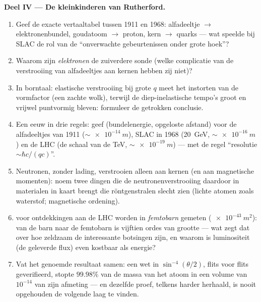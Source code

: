 \begin{problem}
\medskip\noindent\textbf{Deel IV --- De kleinkinderen van Rutherford.}
\begin{enumerate}[resume]
  \item Geef de exacte vertaaltabel tussen 1911 en 1968: alfadeeltje
        $\to$ elektronenbundel, goudatoom $\to$ proton, kern $\to$ quarks
        --- wat speelde bij SLAC de rol van de ``onverwachte
        gebeurtenissen onder grote hoek''?
  \item Waarom zijn \emph{elektronen} de zuiverdere sonde (welke
        complicatie van de verstrooiing van alfadeeltjes aan kernen
        hebben zij niet)?
  \item In borntaal: elastische verstrooiing bij grote $q$ meet het
        instorten van de vormfactor (een zachte wolk), terwijl de
        diep-inelastische tempo's groot en vrijwel puntvormig bleven:
        formuleer de getrokken conclusie.
  \item Een eeuw in drie regels: geef (bundelenergie, opgeloste afstand)
        voor de alfadeeltjes van 1911 ($\sim\qty{e-14}{m}$), SLAC in 1968
        (\qty{20}{GeV}, $\sim\qty{e-16}{m}$) en de LHC (de schaal van de
        TeV, $\sim\qty{e-19}{m}$) --- met de regel ``resolutie $\sim \hbar c/(qc)$''.
  \item Neutronen, zonder lading, verstrooien alleen aan kernen (en aan
        magnetische momenten): noem twee dingen die de
        neutronenverstrooiing daardoor in materialen in kaart brengt die
        röntgenstralen slecht zien (lichte atomen zoals waterstof;
        magnetische ordening).
  \item {} voor ontdekkingen aan de LHC worden in
        \emph{femtobarn} gemeten ($\qty{e-43}{m^2}$): van de barn naar de
        femtobarn is vijftien ordes van grootte --- wat zegt dat over hoe
        zeldzaam de interessante botsingen zijn, en waarom is
        luminositeit (de geleverde flux) even kostbaar als energie?
  \item Vat het genoemde resultaat samen: een wet in $\sin^{-4}(\theta/2)$,
        flits voor flits geverifieerd, stopte $99.98\%$ van de massa van
        het atoom in een volume van $10^{-14}$ van zijn afmeting --- en
        dezelfde proef, telkens harder herhaald, is nooit opgehouden de
        volgende laag te vinden.
\end{enumerate}
\end{problem}
